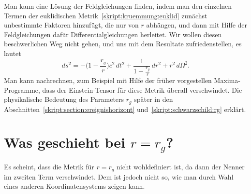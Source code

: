 Man kann eine Lösung der Feldgleichungen finden, indem man den
einzelnen Termen der euklidischen Metrik~\eqref{skript:kruemmung:euklid}
zunächst unbestimmte Faktoren hinzufügt, die nur von $r$ abhängen,
und dann mit Hilfe der Feldgleichungen dafür Differentialgleichungen
herleitet.
Wir wollen diesen beschwerlichen Weg nicht gehen, und uns mit dem
Resultate zufriedenstellen, es lautet
\begin{equation}
ds^2
=
-\biggl(1-\frac{r_g}r\biggr)c^2\,dt^2
+\frac1{\displaystyle 1-\frac{r_g}r}\,dr^2 + r^2\,d\Omega^2.
\label{skript:kruemmung:schwarzschildmetrik}
\end{equation}
Man kann nachrechnen, zum Beispiel mit Hilfe der früher vorgestellen
Maxima-Programme, dass der Einstein-Tensor für diese Metrik überall
verschwindet.
Die physikalische Bedeutung des Parameters $r_g$ später in
den Abschnitten~\ref{skript:section:ereignishorizont}
und~\ref{skript:schwarzschild:rg} erklärt.

\section{Was geschieht bei $r=r_g$?}
Es scheint, dass die Metrik für $r=r_g$ nicht wohldefiniert ist,
da dann der Nenner im zweiten Term verschwindet.
Dem ist jedoch nicht so, wie man durch Wahl eines anderen Koordinatensystems
zeigen kann.

